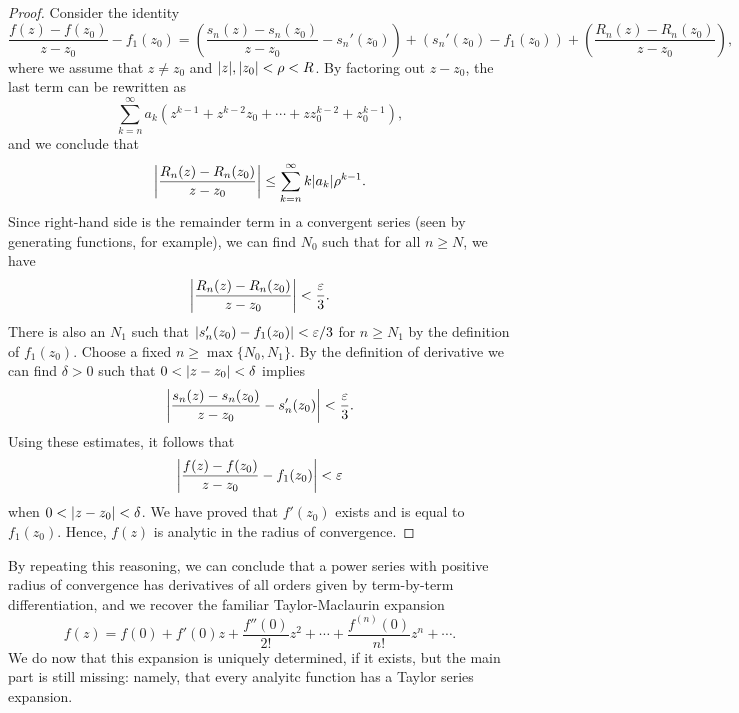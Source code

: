 \begin{proof}
	Consider the identity $$\dfrac{f(z)-f(z_0)}{z-z_0}-f_1(z_0)=\left(\dfrac{s_n(z)-s_n(z_0)}{z-z_0}-s_n'(z_0)\right)+\left(s_n'(z_0)-f_1(z_0)\right)+\left(\dfrac{R_n(z)-R_n(z_0)}{z-z_0}\right),$$ where we assume that $z \neq z_0$ and $\lvert z \rvert,\lvert z_0 \rvert<\rho<R$. By factoring out $z-z_0$, the last term can be rewritten as $$\sum_{k=n}^{\infty}a_k\left(z^{k-1}+z^{k-2}z_0+\cdots+zz_0^{k-2}+z_0^{k-1}\right),$$ and we conclude that $$\left\lvert \dfrac{R_n(z)-R_n(z_0)}{z-z_0}\right \rvert \le \sum_{k=n}^{\infty}k\lvert a_k \rvert\rho^{k-1}.$$ Since right-hand side is the remainder term in a convergent series (seen by generating functions, for example), we can find $N_0$ such that for all $n \ge N$, we have $$\left\lvert \dfrac{R_n(z)-R_n(z_0)}{z-z_0}\right \rvert<\dfrac{\varepsilon}{3}.$$ There is also an $N_1$ such that $\lvert s_n'(z_0)-f_1(z_0) \rvert<\varepsilon/3$ for $n \ge N_1$ by the definition of $f_1(z_0)$. Choose a fixed $n \ge \max\{N_0,N_1\}$. By the definition of derivative we can find $\delta>0$ such that $0<\lvert z-z_0 \rvert<\delta$ implies $$\left\lvert \dfrac{s_n(z)-s_n(z_0)}{z-z_0}-s_n'(z_0)\right \rvert<\dfrac{\varepsilon}{3}.$$ Using these estimates, it follows that $$\left\lvert \dfrac{f(z)-f(z_0)}{z-z_0}-f_1(z_0)\right \rvert<\varepsilon$$ when $0<\lvert z-z_0 \rvert<\delta$. We have proved that $f'(z_0)$ exists and is equal to $f_1(z_0)$. Hence, $f(z)$ is analytic in the radius of convergence.
\end{proof}

By repeating this reasoning, we can conclude that a power series with positive radius of convergence has derivatives of all orders given by term-by-term differentiation, and we recover the familiar Taylor-Maclaurin expansion $$f(z)=f(0)+f'(0)z+\dfrac{f''(0)}{2!}z^2+\cdots+\dfrac{f^{(n)}(0)}{n!}z^n+\cdots.$$ We do now that this expansion is uniquely determined, if it exists, but the main part is still missing: namely, that every analyitc function has a Taylor series expansion.

